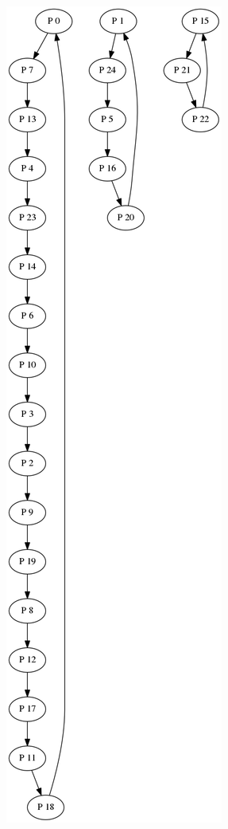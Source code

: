 \begin{figure}
    \centering
    \begin{subfigure}{0.6\textwidth}
    \centering
        \includegraphics[width=0.8\linewidth]{figures/random25.png}

\end{subfigure}
\end{figure}
